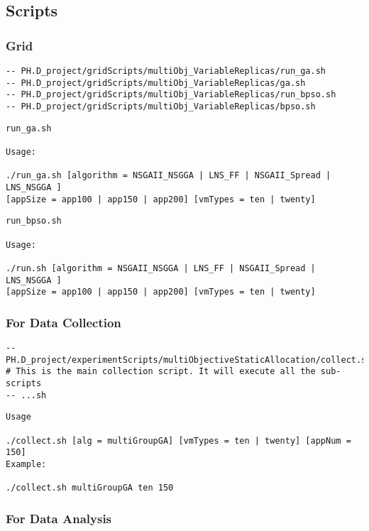 \subsection{Scripts}

\subsubsection{Grid}
\begin{lstlisting}
-- PH.D_project/gridScripts/multiObj_VariableReplicas/run_ga.sh
-- PH.D_project/gridScripts/multiObj_VariableReplicas/ga.sh
-- PH.D_project/gridScripts/multiObj_VariableReplicas/run_bpso.sh
-- PH.D_project/gridScripts/multiObj_VariableReplicas/bpso.sh
\end{lstlisting}

\begin{lstlisting}
run_ga.sh

Usage:

./run_ga.sh [algorithm = NSGAII_NSGGA | LNS_FF | NSGAII_Spread | LNS_NSGGA ] 
[appSize = app100 | app150 | app200] [vmTypes = ten | twenty]
\end{lstlisting}

\begin{lstlisting}
run_bpso.sh

Usage: 

./run.sh [algorithm = NSGAII_NSGGA | LNS_FF | NSGAII_Spread | LNS_NSGGA ] 
[appSize = app100 | app150 | app200] [vmTypes = ten | twenty]

\end{lstlisting}

\subsubsection{For Data Collection}

\begin{lstlisting}
-- PH.D_project/experimentScripts/multiObjectiveStaticAllocation/collect.sh			
# This is the main collection script. It will execute all the sub-scripts
-- ...sh
\end{lstlisting}

\begin{lstlisting}
Usage 

./collect.sh [alg = multiGroupGA] [vmTypes = ten | twenty] [appNum = 150]
Example:

./collect.sh multiGroupGA ten 150
\end{lstlisting}

\subsubsection{For Data Analysis}


